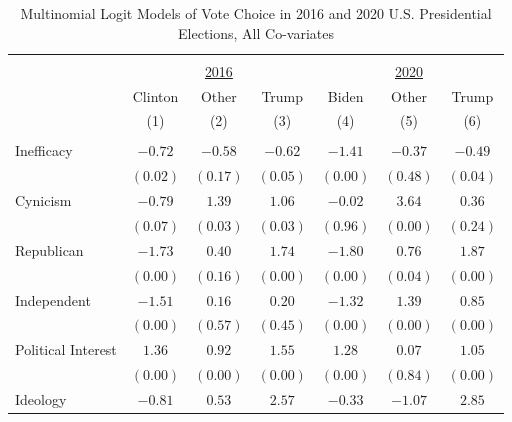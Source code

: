 \begin{table}[!htbp] \centering 
  \caption{Multinomial Logit Models of Vote Choice in 2016 and 2020 U.S. Presidential Elections, All Co-variates} 
  \label{tab:votechoice-16-20} 
  \renewcommand{\arraystretch}{1}
\begin{adjustbox}{width=0.8\textwidth,center}
\begin{threeparttable}
\begin{tabular}{lccc|ccc}
\\\hline 
\hline 
&&&&&& \\[-1ex]
& & \underline{2016} & & & \underline{2020} & \\[0.8ex]
& Clinton & Other & Trump & Biden & Other & Trump \\[1ex]
& (1) & (2) & (3) & (4) & (5) & (6)\\[1ex]\hline 
  & & & & & &\\
Inefficacy                      & $-0.72$   & $-0.58$   & $-0.62$   & $-1.41$   & $-0.37$   & $-0.49$   \\
                                & $(0.02)$  & $(0.17)$  & $(0.05)$  & $(0.00)$  & $(0.48)$  & $(0.04)$  \\
Cynicism                        & $-0.79$   & $1.39$    & $1.06$    & $-0.02$   & $3.64$    & $0.36$    \\
                                & $(0.07)$  & $(0.03)$  & $(0.03)$  & $(0.96)$  & $(0.00)$  & $(0.24)$  \\
Republican                      & $-1.73$   & $0.40$    & $1.74$    & $-1.80$   & $0.76$    & $1.87$    \\
                                & $(0.00)$  & $(0.16)$  & $(0.00)$  & $(0.00)$  & $(0.04)$  & $(0.00)$  \\
Independent                     & $-1.51$   & $0.16$    & $0.20$    & $-1.32$   & $1.39$    & $0.85$    \\
                                & $(0.00)$  & $(0.57)$  & $(0.45)$  & $(0.00)$  & $(0.00)$  & $(0.00)$  \\
Political Interest              & $1.36$    & $0.92$    & $1.55$    & $1.28$    & $0.07$    & $1.05$    \\
                                & $(0.00)$  & $(0.00)$  & $(0.00)$  & $(0.00)$  & $(0.84)$  & $(0.00)$  \\
Ideology                        & $-0.81$   & $0.53$    & $2.57$    & $-0.33$   & $-1.07$   & $2.85$    \\

\end{tabular}
\end{threeparttable}
\end{adjustbox}
\end{table}
